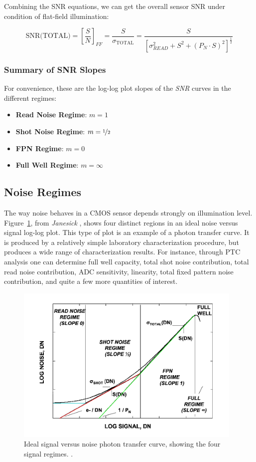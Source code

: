 \documentclass[10pt]{article}
\begin{document}
Combining the SNR equations, we can get the overall sensor SNR under condition of flat-field illumination:

$$ \text{SNR(TOTAL)} = \left [ \frac{S}{N} \right ] _ {FF} = \frac{S}{\sigma_{\text{TOTAL}}} =  \frac{S}{\left [ \sigma^2_{READ} + S^2 + (P_N \cdot S)^2 \right ]^ \frac{1}{2}} $$

\subsubsection{Summary of SNR Slopes}

For convenience, these are the log-log plot slopes of the \emph{SNR} curves in the different regimes:

\begin{itemize}[noitemsep]
    \item \textbf{Read Noise Regime}: $m=1$
    \item \textbf{Shot Noise Regime}: $m=\nicefrac{1}{2}$
    \item \textbf{FPN Regime}: $m=0$
    \item \textbf{Full Well Regime}: $m=\infty$
\end{itemize}

\subsection{Noise Regimes}

The way noise behaves in a CMOS sensor depends strongly on illumination level. Figure~\ref{fig:regimes}, from \emph{Janesick} \cite{janesick}, shows four distinct regions in an ideal noise versus signal log-log plot. This type of plot is an example of a photon transfer curve. It is produced by a relatively simple laboratory characterization procedure, but produces a wide range of characterization results. For instance, through PTC analysis one can determine full well capacity, total shot noise contribution, total read noise contribution, ADC sensitivity, linearity, total fixed pattern noise contribution, and quite a few more quantities of interest.


\begin{figure}[!t]
    \centering
        \includegraphics[height=3.0in]{Noise Regimes.png}
    \caption{Ideal signal versus noise photon transfer curve, showing the four signal regimes. \cite{janesick}.}
    \label{fig:regimes}
\end{figure}
\end{document}
